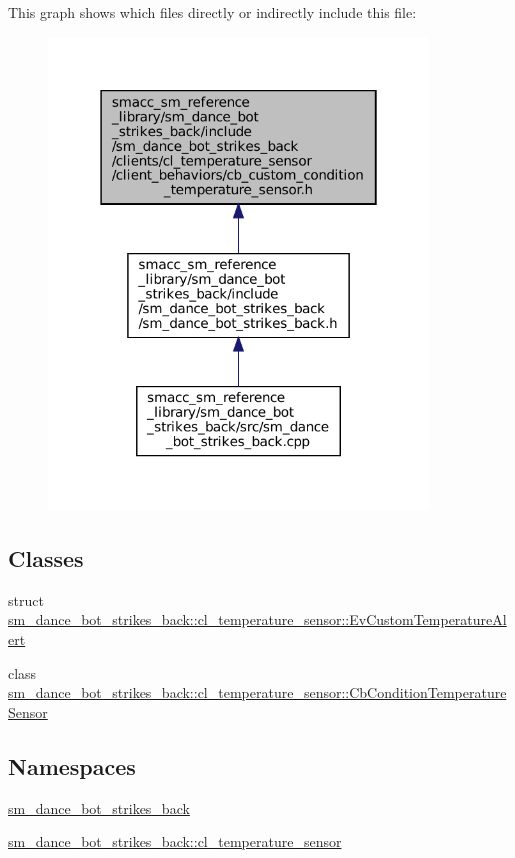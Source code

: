 This graph shows which files directly or indirectly include this file\+:
\nopagebreak
\begin{figure}[H]
\begin{center}
\leavevmode
\includegraphics[width=286pt]{sm__dance__bot__strikes__back_2include_2sm__dance__bot__strikes__back_2clients_2cl__temperature_deec34b2a1f1cfb23fb2c9f2738abe0c}
\end{center}
\end{figure}
\subsection*{Classes}
\begin{DoxyCompactItemize}
\item 
struct \hyperlink{structsm__dance__bot__strikes__back_1_1cl__temperature__sensor_1_1EvCustomTemperatureAlert}{sm\+\_\+dance\+\_\+bot\+\_\+strikes\+\_\+back\+::cl\+\_\+temperature\+\_\+sensor\+::\+Ev\+Custom\+Temperature\+Alert}
\item 
class \hyperlink{classsm__dance__bot__strikes__back_1_1cl__temperature__sensor_1_1CbConditionTemperatureSensor}{sm\+\_\+dance\+\_\+bot\+\_\+strikes\+\_\+back\+::cl\+\_\+temperature\+\_\+sensor\+::\+Cb\+Condition\+Temperature\+Sensor}
\end{DoxyCompactItemize}
\subsection*{Namespaces}
\begin{DoxyCompactItemize}
\item 
 \hyperlink{namespacesm__dance__bot__strikes__back}{sm\+\_\+dance\+\_\+bot\+\_\+strikes\+\_\+back}
\item 
 \hyperlink{namespacesm__dance__bot__strikes__back_1_1cl__temperature__sensor}{sm\+\_\+dance\+\_\+bot\+\_\+strikes\+\_\+back\+::cl\+\_\+temperature\+\_\+sensor}
\end{DoxyCompactItemize}
